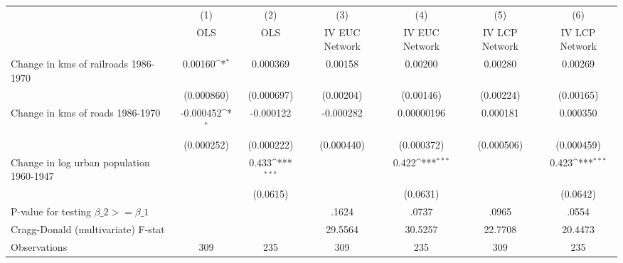 {
\def\sym#1{\ifmmode^{#1}\else\(^{#1}\)\fi}
\begin{tabular}{l*{6}{c}}
\hline\hline
                &\multicolumn{1}{c}{(1)}&\multicolumn{1}{c}{(2)}&\multicolumn{1}{c}{(3)}&\multicolumn{1}{c}{(4)}&\multicolumn{1}{c}{(5)}&\multicolumn{1}{c}{(6)}\\
                &\multicolumn{1}{c}{OLS}&\multicolumn{1}{c}{OLS}&\multicolumn{1}{c}{IV EUC Network}&\multicolumn{1}{c}{IV EUC Network}&\multicolumn{1}{c}{IV LCP Network}&\multicolumn{1}{c}{IV LCP Network}\\
\hline
Change in kms of railroads 1986-1970&  0.00160\sym{*}  & 0.000369         &  0.00158         &  0.00200         &  0.00280         &  0.00269         \\
                &(0.000860)         &(0.000697)         &(0.00204)         &(0.00146)         &(0.00224)         &(0.00165)         \\
[1em]
Change in kms of roads 1986-1970&-0.000452\sym{*}  &-0.000122         &-0.000282         &0.00000196         & 0.000181         & 0.000350         \\
                &(0.000252)         &(0.000222)         &(0.000440)         &(0.000372)         &(0.000506)         &(0.000459)         \\
[1em]
Change in log urban population 1960-1947&                  &    0.433\sym{***}&                  &    0.422\sym{***}&                  &    0.423\sym{***}\\
                &                  & (0.0615)         &                  & (0.0631)         &                  & (0.0642)         \\
\hline
P-value for testing $\beta\_{2} >= \beta\_{1}$&                  &                  &    .1624         &    .0737         &    .0965         &    .0554         \\
Cragg-Donald (multivariate) F-stat&                  &                  &  29.5564         &  30.5257         &  22.7708         &  20.4473         \\
Observations    &      309         &      235         &      309         &      235         &      309         &      235         \\
\hline\hline
\end{tabular}
}
